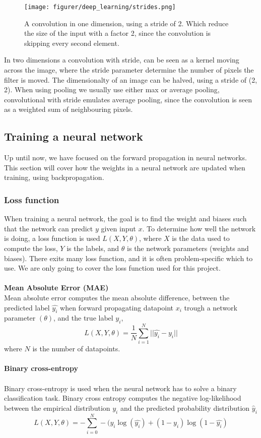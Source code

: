 \documentclass[11pt]{article}
\begin{document}
\begin{figure}[!h]
    \centering
    \texttt{[image: figurer/deep\_learning/strides.png]}
    \caption{A convolution in one dimension, using a stride of 2. Which reduce the size of the input with a factor 2, since the convolution is skipping every second element.}
    \label{fig:deep_learning_strides}
\end{figure}
In two dimensions a convolution with stride, can be seen as a kernel moving across the image, where the stride parameter determine the number of pixels the filter is moved. The dimensionalty of an image can be halved, using a stride of (2, 2). When using pooling we usually use either max or average pooling, convolutional with stride emulates average pooling, since the convolution is seen as a weighted sum of neighbouring pixels.


\subsection{Training a neural network}
Up until now, we have focused on the forward propagation in neural networks. This section will cover how the weights in a neural network are updated when training, using backpropagation.

\subsubsection{Loss function}\label{sec:loss_function}
When training a neural network, the goal is to find the weight and biases such that the network can predict $y$ given input $x$. To determine how well the network is doing, a loss function is used $L(X, Y, \theta)$, where $X$ is the data used to compute the loss, $Y$ is the labels, and $\theta$ is the network parameters (weights and biases). There exits many loss function, and it is often problem-specific which to use. We are only going to cover the loss function used for this project.
\\ \\
\textbf{Mean Absolute Error (MAE)}
\\
Mean absolute error computes the mean absolute difference, between the predicted label $\hat{y_{i}}$ when forward propagating datapoint $x_{i}$ trough a network parameter $(\theta)$, and the true label $y_{i}$,
\begin{equation}
    L(X, Y, \theta) = \frac{1}{N} \sum_{i = 1}^{N} || \hat{y_{i}} - y_{i} ||
\end{equation}
where $N$ is the number of datapoints.
\\ \\
\textbf{Binary cross-entropy}
\\ \\
Binary cross-entropy is used when the neural network has to solve a binary classification task. Binary cross entropy computes the negative log-likelihood between the empirical distribution $y_{i}$ and the predicted probability distribution $\hat{y}_{i}$
\begin{equation}
    L(X, Y, \theta) = - \sum_{i = 0}^{N} -(y_{i} \log(\hat{y_{i}}) + (1 - y_{i}) \log (1 - \hat{y_{i}}) 
\end{equation}
\end{document}

